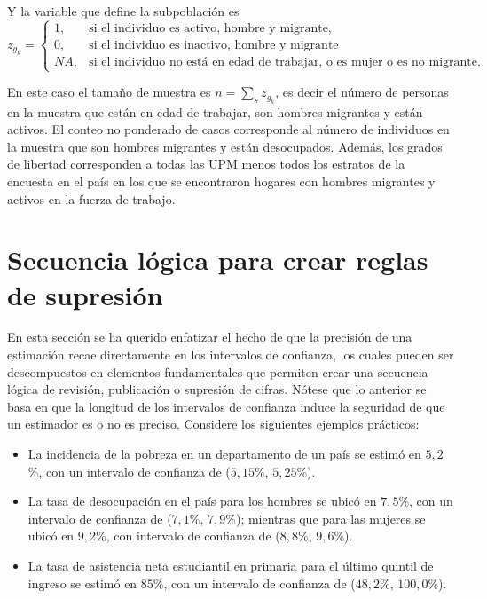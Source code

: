 \documentclass[
  10pt,
  spanish,
]{book}
\providecommand{\tightlist}{%
  \setlength{\itemsep}{0pt}\setlength{\parskip}{0pt}}
\begin{document}
Y la variable que define la subpoblación es
\[
z_{g_k}=
\begin{cases}
1, &\text{si el individuo es activo, hombre y migrante,}\\
0, &\text{si el individuo es inactivo, hombre y migrante}\\
NA, &\text{si el individuo no está en edad de trabajar, o es mujer o es no migrante.}
\end{cases}
\]

En este caso el tamaño de muestra es \(n = \sum_s z_{g_k}\), es decir el número de personas en la muestra que están en edad de trabajar, son hombres migrantes y están activos. El conteo no ponderado de casos corresponde al número de individuos en la muestra que son hombres migrantes y están desocupados. Además, los grados de libertad corresponden a todas las UPM menos todos los estratos de la encuesta en el país en los que se encontraron hogares con hombres migrantes y activos en la fuerza de trabajo.

\hypertarget{secuencia-luxf3gica-para-crear-reglas-de-supresiuxf3n}{%
\section{Secuencia lógica para crear reglas de supresión}\label{secuencia-luxf3gica-para-crear-reglas-de-supresiuxf3n}}

En esta sección se ha querido enfatizar el hecho de que la precisión de una estimación recae directamente en los intervalos de confianza, los cuales pueden ser descompuestos en elementos fundamentales que permiten crear una secuencia lógica de revisión, publicación o supresión de cifras. Nótese que lo anterior se basa en que la longitud de los intervalos de confianza induce la seguridad de que un estimador es o no es preciso. Considere los siguientes ejemplos prácticos:

\begin{itemize}
\tightlist
\item
  La incidencia de la pobreza en un departamento de un país se estimó en \(5,2\)\%, con un intervalo de confianza de (\(5,15\)\%, \(5,25\)\%).
\item
  La tasa de desocupación en el país para los hombres se ubicó en \(7,5\)\%, con un intervalo de confianza de (\(7,1\)\%, \(7,9\)\%); mientras que para las mujeres se ubicó en \(9,2\)\%, con intervalo de confianza de (\(8,8\)\%, \(9,6\)\%).
\item
  La tasa de asistencia neta estudiantil en primaria para el último quintil de ingreso se estimó en \(85\)\%, con un intervalo de confianza de (\(48,2\)\%, \(100,0\)\%).
\end{itemize}
\end{document}
